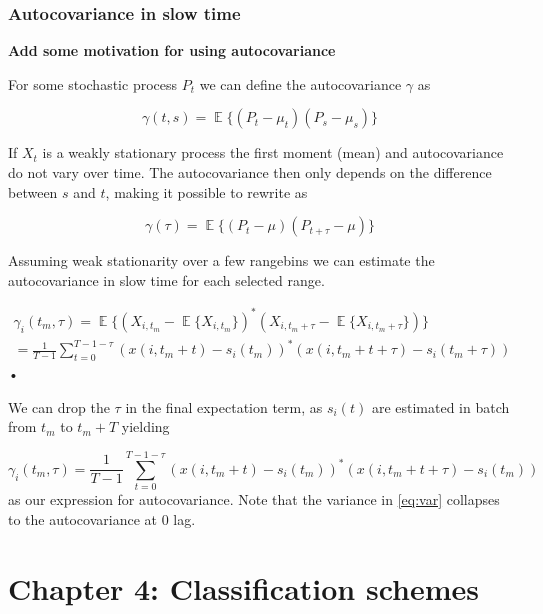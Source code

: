 \documentclass[a4paper, 12pt]{article}
\DeclareMathOperator*{\E}{\mathbb{E}}
\begin{document}
\subsubsection{Autocovariance in slow time}

\textbf{Add some motivation for using autocovariance}

\noindent
For some stochastic process $P_t$ we can define the autocovariance $\gamma$ as

\begin{equation}
	\gamma(t, s) = \E\big\{(P_t - \mu_t)(P_s - \mu_s)\big\}
\end{equation}

If $X_t$ is a weakly stationary process the first moment (mean) and autocovariance do not vary over time.  The autocovariance then only depends on the difference between $s$ and $t$, making it possible to rewrite as

\begin{equation}
	\gamma(\tau) = \E\big\{(P_t - \mu)(P_{t+\tau} - \mu)\big\}
\end{equation}

Assuming weak stationarity over a few rangebins we can estimate the autocovariance in slow time for each selected range. 

\begin{equation}
\begin{gathered}
	\gamma_i(t_m, \tau) = \E\big\{(X_{i,t_m} - \E\{X_{i, t_m}\})^*(X_{i, t_m+\tau} - \E\{X_{i, t_m+\tau}\})\big\}\\
	= \frac{1}{T-1}\sum_{t=0}^{T-1-\tau}(x(i, t_m + t) - s_i(t_m))^*(x(i, t_m + t + \tau) - s_i(t_m + \tau))
\end{gathered}
\end{equation}•

We can drop the $\tau$ in the final expectation term, as $s_i(t)$ are estimated in batch from $t_m$ to  $t_m + T$ yielding

\begin{equation}
	\gamma_i(t_m, \tau) = \frac{1}{T-1}\sum_{t=0}^{T-1- \tau}(x(i, t_m + t) - s_i(t_m))^*(x(i, t_m + t + \tau) - s_i(t_m))
\end{equation}
as our expression for autocovariance. Note that the variance in \ref{eq:var} collapses to the autocovariance at 0 lag. 


\section{Chapter 4: Classification schemes}
\end{document}
